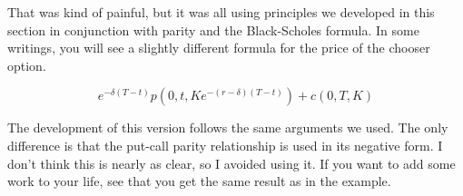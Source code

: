 \documentclass{ximera}
\begin{document}
That was kind of painful, but it was all using principles we developed in this section in conjunction with parity and the Black-Scholes formula. In some writings, you will see a slightly different formula for the price of the chooser option.

\begin{equation*}
e^{-\delta(T-t)}p(0,t,Ke^{-(r-\delta)(T-t)})+c(0,T,K)
\end{equation*}

The development of this version follows the same arguments we used. The only difference is that the put-call parity relationship is used in its negative form. I don't think this is nearly as clear, so I avoided using it. If you want to add some work to your life, see that you get the same result as in the example.
\end{document}
